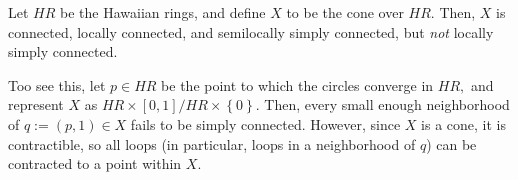 \documentclass[12pt]{article}
\newcommand{\set}[1]{\left\{#1\right\}}
\newcommand{\cross}{\times}
\begin{document}
Let $HR$ be the Hawaiian rings, and define $X$ to be the cone over $HR.$ Then, $X$ is connected, locally connected, and semilocally simply connected, but {\em not} locally simply connected.

Too see this, let $p\in HR$ be the point to which the circles converge in $HR,$ and represent $X$ as $HR\cross [0,1]/ HR\cross\set{0}.$ Then, every small enough neighborhood of $q:=(p,1)\in X$ fails to be  simply connected. However, since $X$ is a cone, it is contractible, so all loops (in particular, loops in a neighborhood of $q$) can be contracted to a point within $X$.
\end{document}

